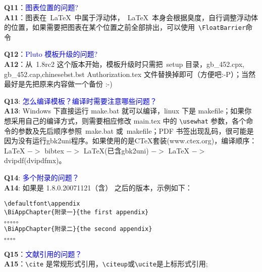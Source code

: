 \noindent \textbf{Q11}：\textcolor{blue}{图表位置的问题?}\\
\textbf{A11}：图表在~\LaTeX~中属于浮动体，~\LaTeX~本身会根据臭度，自行调整浮动体的位置，如果需要把图表在某个位置之前全部排出，可以使用~\verb+\FloatBarrier+命令

\noindent \textbf{Q12}：\textcolor{blue}{Pluto 模板升级的问题?}\\
\textbf{A12}：从~1.8rc2 这个版本开始，模板升级时只需把~setup 目录，gb\_452.cpx, gb\_452.cap,chinesebst.bst Authorization.tex 文件替换掉即可（方便吧:-P）；当然最好是先把原来内容做一个备份 :-)

\noindent \textbf{Q13}: \textcolor{blue}{怎么编译模板？编译时需要注意哪些问题？}\\
\textbf{A13}: Windows 下直接运行 make.bat 就可以编译，linux 下是 makefile；如果你想采用自己的编译方式，则需要相应修改 main.tex 中的 \verb+\usewhat+ 参数，各个命令的参数及先后顺序参照~make.bat 或~makefile；PDF 书签出现乱码，很可能是因为没有运行gbk2uni程序。如果使用的是CTeX套装(www.ctex.org)，编译顺序：LaTeX $->$ bibtex $->$ LaTeX(已含gbk2uni) $->$ LaTeX $->$dvipdf(dvipdfmx)。

\noindent \textbf{Q14}: \textcolor{blue}{多个附录的问题？}\\
\textbf{A14}: 如果是 1.8.0.20071121（含） 之后的版本，示例如下：
\begin{verbatim}
\defaultfont\appendix
\BiAppChapter{附录一}{the first appendix}
。。。。。
\BiAppChapter{附录二}{the second appendix}
。。。。
\end{verbatim}

\noindent \textbf{Q15}：\textcolor{blue}{文献引用的问题？ }\\
\textbf{A15}：\verb+\cite+ 是常规形式引用，\verb+\citeup+或\verb+\ucite+是上标形式引用;

